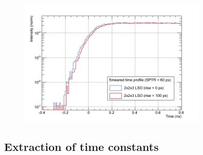 \begin{figure}[htbp]
\begin{center}
\includegraphics[width=9cm]{../Pictures/Chapter_6/smear_profile.png}
\end{center}
\caption[]{}
\label{fig:smear_tot}
\end{figure}

\subsection{Extraction of time constants}
